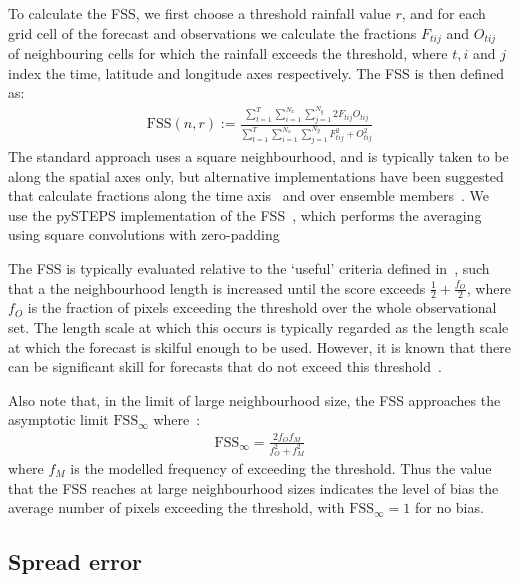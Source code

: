 \documentclass[../main.tex]{subfiles}
\begin{document}
To calculate the FSS, we first choose a threshold rainfall value $r$, and for each grid cell of the forecast and observations we calculate the fractions $F_{tij}$ and $O_{tij}$ of neighbouring cells for which the rainfall exceeds the threshold, where $t,i$ and $j$ index the time, latitude and longitude axes respectively. The FSS is then defined as:
\begin{align}
    \text{FSS}(n, r) := \frac{\sum_{t=1}^{T}\sum_{i=1}^{N_x} \sum_{j=1}^{N_y} 2 F_{tij}O_{tij}}{\sum_{t=1}^{T}\sum_{i=1}^{N_x}\sum_{j=1}^{N_y} F_{tij}^2 + O_{tij}^2 } \label{eq:fss_main}
\end{align}
The standard approach uses a square neighbourhood, and is typically taken to be along the spatial axes only, but alternative implementations have been suggested that calculate fractions along the time axis~\citep{woodhams_what_2018} and over ensemble members~\citep{duc_spatial-temporal_2013}. We use the pySTEPS implementation of the FSS~\citep{pulkkinen_pysteps_2019}, which performs the averaging using square convolutions with zero-padding

The FSS is typically evaluated relative to the `useful' criteria defined in~\cite{roberts_assessing_2008, roberts_scale-selective_2008}, such that a the neighbourhood length is increased until the score exceeds $\frac{1}{2} + \frac{f_O}{2}$, where $f_O$ is the fraction of pixels exceeding the threshold over the whole observational set. The length scale at which this occurs is typically regarded as the length scale at which the forecast is skilful enough to be used. However, it is known that there can be significant skill for forecasts that do not exceed this threshold~\citep{nachamkin_applying_2015, mittermaier_long-term_2013}. 

Also note that, in the limit of large neighbourhood size, the FSS approaches the asymptotic limit $\text{FSS}_{\infty}$ where~\citep{roberts_scale-selective_2008}:
\begin{align}
\text{FSS}_{\infty} = \frac{2 f_Of_M}{ f_O^2 + f_M^2}
\end{align}
where $f_M$ is the modelled frequency of exceeding the threshold. Thus the value that the FSS reaches at large neighbourhood sizes indicates the level of bias the average number of pixels exceeding the threshold, with $\text{FSS}_{\infty}=1$ for no bias.

\subsection{Spread error}
\end{document}
